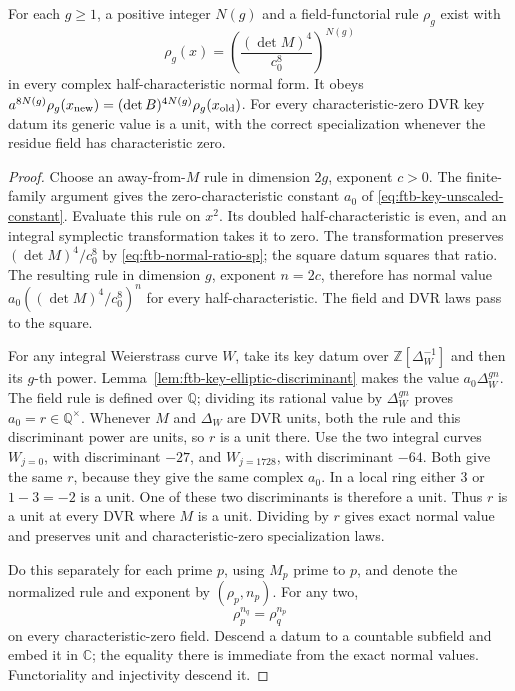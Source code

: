 \begin{srproposition}
\label{prop:ftb-normalized-powered-key}
For each \(g\geq1\), a positive integer \(N(g)\) and a field-functorial
rule \(\rho_g\) exist with
\[
 \rho_g(x)=
       \left(\frac{(\det M)^4}{c_0^8}\right)^{N(g)}
 \tag{A2}\label{eq:ftb-powered-normal-value}
\]
in every complex half-characteristic normal form.
It obeys
\(a^{8N(g)}\rho_g(x_{\rm new})
=(\det B)^{4N(g)}\rho_g(x_{\rm old})\).
For every characteristic-zero DVR key datum its generic value
is a unit, with the correct specialization whenever the residue
field has characteristic zero.
\end{srproposition}
\begin{proof}
Choose an away-from-\(M\) rule in dimension \(2g\), exponent \(c>0\).
The finite-family argument gives the zero-characteristic constant
\(a_0\) of \eqref{eq:ftb-key-unscaled-constant}.
Evaluate this rule on \(x^2\).
Its doubled half-characteristic is even, and an integral symplectic
transformation takes it to zero.  The transformation preserves
\((\det M)^4/c_0^8\) by
\eqref{eq:ftb-normal-ratio-sp}; the square datum squares that ratio.
The resulting rule in dimension \(g\), exponent \(n=2c\), therefore
has normal value \(a_0((\det M)^4/c_0^8)^n\) for every
half-characteristic.  The field and DVR laws pass to the square.

For any integral Weierstrass curve \(W\), take its key datum over
\(\mathbb Z[\Delta_W^{-1}]\) and then its \(g\)-th power.
Lemma~\ref{lem:ftb-key-elliptic-discriminant} makes the value
\(a_0\Delta_W^{gn}\).  The field rule is defined over \(\mathbb Q\);
dividing its rational value by \(\Delta_W^{gn}\) proves
\(a_0=r\in\mathbb Q^\times\).
Whenever \(M\) and \(\Delta_W\) are DVR units, both the rule and
this discriminant power are units, so \(r\) is a unit there.
Use the two integral curves \(W_{j=0}\), with discriminant \(-27\),
and \(W_{j=1728}\), with discriminant \(-64\).
Both give the same \(r\), because they give the same complex \(a_0\).
In a local ring either \(3\) or \(1-3=-2\) is a unit.
One of these two discriminants is therefore a unit.
Thus \(r\) is a unit at every DVR where \(M\) is a unit.
Dividing by \(r\) gives exact normal value and preserves unit
and characteristic-zero specialization laws.

Do this separately for each prime \(p\), using \(M_p\) prime to
\(p\), and denote the normalized rule and exponent by
\((\rho_p,n_p)\).
For any two,
\[
                             \rho_p^{n_q}=\rho_q^{n_p}
 \tag{A3}\label{eq:ftb-powered-cross}
\]
on every characteristic-zero field.  Descend a datum to a
countable subfield and embed it in \(\mathbb C\); the equality
there is immediate from the exact normal values.
Functoriality and injectivity descend it.


\end{proof}
